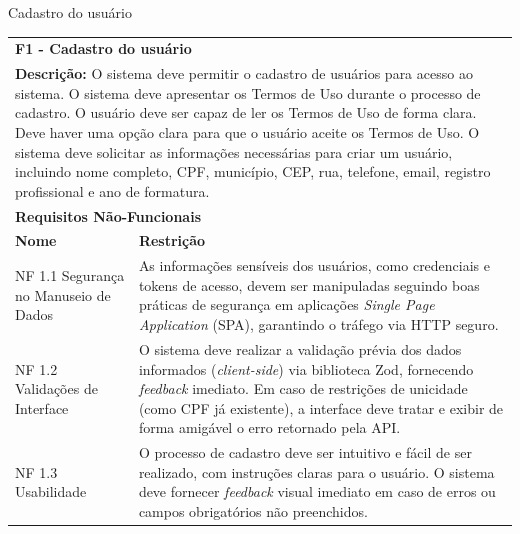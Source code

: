 \begin{tabframed}[htb]
  \caption{Cadastro do usuário}
  \label{quad:requisitoCadastroUsuario}
  \renewcommand{\arraystretch}{1.5}
  \begin{tabular}{|l|l|}
    \cline{1-2}
    \multicolumn{2}{|l|}{\textbf{F1 - Cadastro do usuário} }
    \\ \cline{1-2}

    \multicolumn{2}{|p{15cm}|}{
    \raggedright \textbf{Descrição:} O sistema deve permitir o cadastro de usuários para acesso ao sistema. O sistema deve apresentar os Termos de Uso durante o processo de cadastro. O usuário deve ser capaz de ler os Termos de Uso de forma clara. Deve haver uma opção clara para que o usuário aceite os Termos de Uso. O sistema deve solicitar as informações necessárias para criar um usuário, incluindo nome completo, CPF, município, CEP, rua, telefone, email, registro profissional e ano de formatura.
    }
    \\ \cline{1-2}

    \multicolumn{2}{|l|}{\textbf{Requisitos Não-Funcionais}}
    \\ \cline{1-2}

    \textbf{Nome}                  &
    \textbf{Restrição}
    \\ \cline{1-2}

    NF 1.1 Segurança no Manuseio de Dados &
    \multicolumn{1}{|p{8cm}|}{\raggedright As informações sensíveis dos usuários, como credenciais e tokens de acesso, devem ser manipuladas seguindo boas práticas de segurança em aplicações \textit{Single Page Application} (SPA), garantindo o tráfego via \gls{HTTP} seguro.}
    \\ \cline{1-2}

    NF 1.2 Validações de Interface &
    \multicolumn{1}{|p{8cm}|}{\raggedright O sistema deve realizar a validação prévia dos dados informados (\textit{client-side}) via biblioteca Zod, fornecendo \textit{feedback} imediato. Em caso de restrições de unicidade (como CPF já existente), a interface deve tratar e exibir de forma amigável o erro retornado pela \gls{API}.}
    \\ \cline{1-2}

    NF 1.3 Usabilidade             &
    \multicolumn{1}{|p{8cm}|}{\raggedright O processo de cadastro deve ser intuitivo e fácil de ser realizado, com instruções claras para o usuário. O sistema deve fornecer \textit{feedback} visual imediato em caso de erros ou campos obrigatórios não preenchidos.}
    \\ \cline{1-2}
  \end{tabular}
  \fonte{} %
\end{tabframed}

